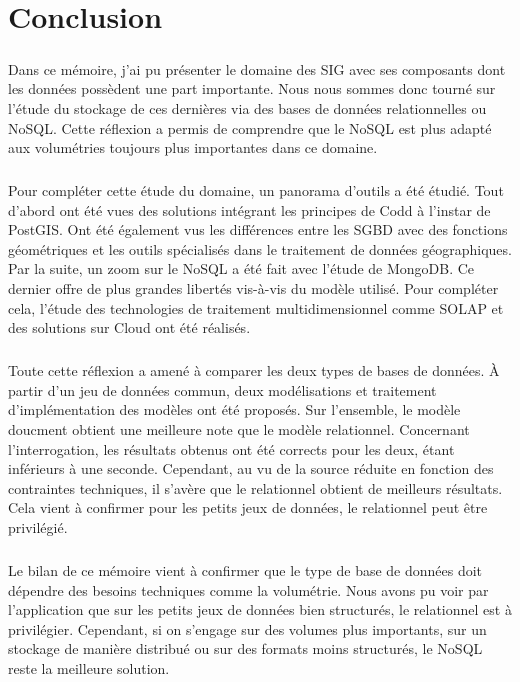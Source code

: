 \chapter{Conclusion}


\paragraph{}Dans ce mémoire, j'ai pu présenter le domaine des \acrfull{SIG} avec ses composants dont les données possèdent une part importante. Nous nous sommes donc tourné sur l'étude du stockage de ces dernières via des bases de données relationnelles ou NoSQL. Cette réflexion a permis de comprendre que le NoSQL est plus adapté aux volumétries toujours plus importantes dans ce domaine.

\paragraph{}Pour compléter cette étude du domaine, un panorama d'outils a été étudié. Tout d'abord ont été vues des solutions intégrant les principes de Codd à l'instar de PostGIS. Ont été également vus les différences entre les \acrshort{SGBD} avec des fonctions géométriques et les outils spécialisés dans le traitement de données géographiques. Par la suite, un zoom sur le NoSQL a été fait avec l'étude de MongoDB. Ce dernier offre de plus grandes libertés vis-à-vis du modèle utilisé. Pour compléter cela, l'étude des technologies de traitement multidimensionnel comme SOLAP et des solutions sur Cloud ont été réalisés.

\paragraph{}Toute cette réflexion a amené à comparer les deux types de bases de données. À partir d'un jeu de données commun, deux modélisations et traitement d'implémentation des modèles ont été proposés. Sur l'ensemble, le modèle doucment obtient une meilleure note que le modèle relationnel. Concernant l'interrogation, les résultats obtenus ont été corrects pour les deux, étant inférieurs à une seconde. Cependant, au vu de la source réduite en fonction des contraintes techniques, il s'avère que le relationnel obtient de meilleurs résultats. Cela vient à confirmer pour les petits jeux de données, le relationnel peut être privilégié.

\paragraph{}Le bilan de ce mémoire vient à confirmer que le type de base de données doit dépendre des besoins techniques comme la volumétrie. Nous avons pu voir par l'application que sur les petits jeux de données bien structurés, le relationnel est à privilégier. Cependant, si on s'engage sur des volumes plus importants, sur un stockage de manière distribué ou sur des formats moins structurés, le NoSQL reste la meilleure solution.
